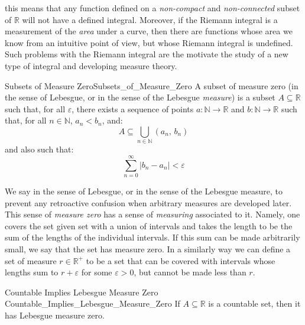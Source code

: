\documentclass[crop=false,class=article]{standalone}                           %
\begin{document}
        this means that any function defined on a \textit{non-compact} and
        \textit{non-connected} subset of $\mathbb{R}$ will not have a defined
        integral. Moreover, if the Riemann integral is a measurement of the
        \textit{area} under a curve, then there are functions whose area we know
        from an intuitive point of view, but whose Riemann integral is
        undefined. Such problems with the Riemann integral are the motivate the
        study of a new type of integral and developing measure theory.
        \begin{fdefinition}{Subsets of Measure Zero}{Subsets_of_Measure_Zero}
            A subset of measure zero (in the sense of Lebesgue, or in the sense
            of the Lebesgue \textit{measure}) is a subset $A\subseteq\mathbb{R}$
            such that, for all $\varepsilon$, there exists a sequence of points
            $a:\mathbb{N}\rightarrow\mathbb{R}$ and
            $b:\mathbb{N}\rightarrow\mathbb{R}$ such that, for all
            $n\in\mathbb{N}$, $a_{n}<b_{n}$, and:
            \begin{equation}
                A\subseteq\bigcup_{n\in\mathbb{N}}(a_{n},\,b_{n})
            \end{equation}
            and also such that:
            \begin{equation}
                \sum_{n=0}^{\infty}|b_{n}-a_{n}|<\varepsilon
            \end{equation}
        \end{fdefinition}
        We say in the sense of Lebesgue, or in the sense of the Lebesgue
        measure, to prevent any retroactive confusion when arbitrary measures
        are developed later. This sense of \textit{measure zero} has a sense of
        \textit{measuring} associated to it. Namely, one covers the set given
        set with a union of intervals and takes the length to be the sum of the
        lengths of the individual intervals. If this sum can be made arbitrarily
        small, we say that the set has measure zero. In a similarly way we can
        define a set of measure $r\in\mathbb{R}^{+}$ to be a set that can be
        covered with intervals whose lengths sum to $r+\varepsilon$ for some
        $\varepsilon>0$, but cannot be made less than $r$.
        \begin{ltheorem}{Countable Implies Lebesgue Measure Zero}
                        {Countable_Implies_Lebesgue_Measure_Zero}
            If $A\subseteq\mathbb{R}$ is a countable set, then it has Lebesgue
            measure zero.
        \end{ltheorem}
\end{document}
